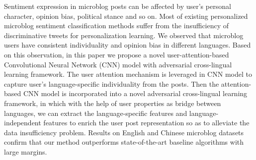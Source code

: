 Sentiment expression in microblog posts can be affected by user's personal character, opinion bias, political stance and so on. Most of existing personalized microblog sentiment classification methods suffer from the insufficiency of discriminative tweets for personalization learning. We observed that microblog users have consistent individuality and opinion bias in different languages. Based on this observation, in this paper we propose a novel user-attention-based Convolutional Neural Network (CNN) model with adversarial cross-lingual learning framework. The user attention mechanism is leveraged in CNN model to capture user's language-specific individuality from the posts. Then the attention-based CNN model is incorporated into a novel adversarial cross-lingual learning framework, in which with the help of user properties as bridge between languages, we can extract the language-specific features and language-independent features to enrich the user post representation so as to alleviate the data insufficiency problem. Results on English and Chinese microblog datasets confirm that our method outperforms state-of-the-art baseline algorithms with large margins.
